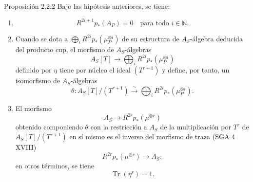 \begin{statement}{Proposición 2.2.2}
Bajo las hipótesis anteriores, se tiene:
\begin{enumerate}[label=\alph*)]
\item
\[
R^{2i+1}p_*(A_P)=0\quad\text{para todo }i\in\mathbb N.
\]
\item Cuando se dota a $\bigoplus_i R^{2i}p_*(\mu_P^{\otimes i})$ de su estructura de $A_S$-álgebra deducida del producto cup, el morfismo de $A_S$-álgebras
\[
A_S[T]\longrightarrow \bigoplus_i R^{2i}p_*(\mu_P^{\otimes i})
\]
definido por $\eta$ tiene por núcleo el ideal $(T^{r+1})$ y define, por tanto, un isomorfismo de $A_S$-álgebras
\[
\theta:A_S[T]/(T^{r+1})\xrightarrow{\sim}\bigoplus_i R^{2i}p_*(\mu_P^{\otimes i}).
\]
\item El morfismo
\[
A_S\longrightarrow R^{2r}p_*(\mu^{\otimes r})
\]
obtenido componiendo $\theta$ con la restricción a $A_S$ de la multiplicación por $T^r$ de $A_S[T]/(T^{r+1})$ en sí mismo es el inverso del morfismo de traza (SGA 4 XVIII)
\[
R^{2r}p_*(\mu^{\otimes r})\longrightarrow A_S;
\]
en otros términos, se tiene
\[
\operatorname{Tr}(\eta^r)=1.
\]
\end{enumerate}
\end{statement}
